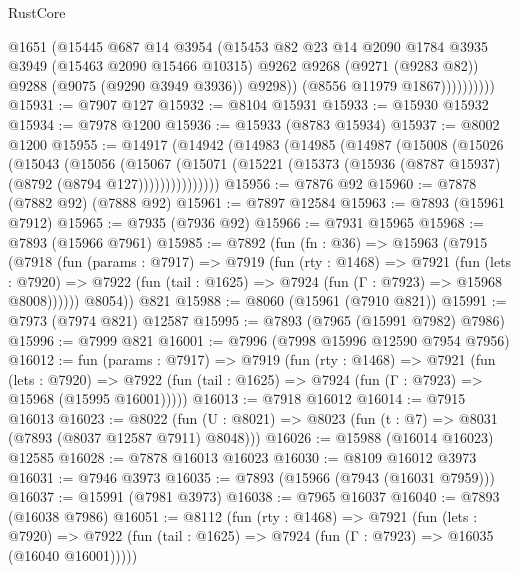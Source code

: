 \begin{lexlean}{RustCore}
\begin{coremodule}
                      @1651
                      (@15445
                        @687
                        @14
                        @3954
                        (@15453
                          @82
                          @23
                          @14
                          @2090
                          @1784
                          @3935
                          @3949
                          (@15463 @2090 @15466 @10315)
                          @9262
                          @9268
                          (@9271 (@9283 @82))
                          @9288
                          (@9075 (@9290 @3949 @3936))
                          @9298))
                      (@8556 @11979 @1867))))))))))
@15931 := @7907 @127
@15932 := @8104 @15931
@15933 := @15930 @15932
@15934 := @7978 @1200
@15936 := @15933 (@8783 @15934)
@15937 := @8002 @1200
@15955 := @14917
    (@14942
      (@14983
        (@14985
          (@14987
            (@15008
              (@15026
                (@15043
                  (@15056
                    (@15067
                      (@15071
                        (@15221 (@15373 (@15936 (@8787 @15937) (@8792 (@8794 @127)))))))))))))))
@15956 := @7876 @92
@15960 := @7878 (@7882 @92) (@7888 @92)
@15961 := @7897 @12584
@15963 := @7893 (@15961 @7912)
@15965 := @7935 (@7936 @92)
@15966 := @7931 @15965
@15968 := @7893 (@15966 @7961)
@15985 := @7892
    (fun (fn : @36) =>
    @15963
      (@7915
        (@7918
          (fun (params : @7917) =>
          @7919
            (fun (rty : @1468) =>
            @7921
              (fun (lets : @7920) =>
              @7922 (fun (tail : @1625) => @7924 (fun (Γ : @7923) => @15968 @8008))))))
        @8054))
    @821
@15988 := @8060 (@15961 (@7910 @821))
@15991 := @7973 (@7974 @821) @12587
@15995 := @7893 (@7965 (@15991 @7982) @7986)
@15996 := @7999 @821
@16001 := @7996 (@7998 @15996 @12590 @7954 @7956)
@16012 := fun (params : @7917) =>
  @7919
    (fun (rty : @1468) =>
    @7921
      (fun (lets : @7920) =>
      @7922 (fun (tail : @1625) => @7924 (fun (Γ : @7923) => @15968 (@15995 @16001)))))
@16013 := @7918 @16012
@16014 := @7915 @16013
@16023 := @8022
    (fun (U : @8021) => @8023 (fun (t : @7) => @8031 (@7893 (@8037 @12587 @7911) @8048)))
@16026 := @15988 (@16014 @16023) @12585
@16028 := @7878 @16013 @16023
@16030 := @8109 @16012 @3973
@16031 := @7946 @3973
@16035 := @7893 (@15966 (@7943 (@16031 @7959)))
@16037 := @15991 (@7981 @3973)
@16038 := @7965 @16037
@16040 := @7893 (@16038 @7986)
@16051 := @8112
    (fun (rty : @1468) =>
    @7921
      (fun (lets : @7920) =>
      @7922 (fun (tail : @1625) => @7924 (fun (Γ : @7923) => @16035 (@16040 @16001)))))

\end{coremodule}
\end{lexlean}
